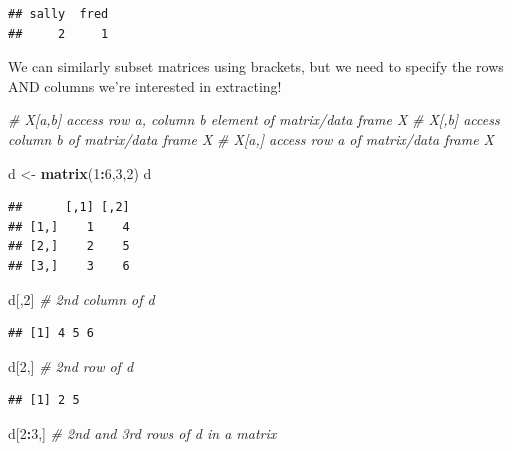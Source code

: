 \documentclass[]{article}
\newenvironment{Shaded}{\begin{snugshade}}{\end{snugshade}}
\newcommand{\KeywordTok}[1]{\textcolor[rgb]{0.13,0.29,0.53}{\textbf{#1}}}
\newcommand{\DecValTok}[1]{\textcolor[rgb]{0.00,0.00,0.81}{#1}}
\newcommand{\StringTok}[1]{\textcolor[rgb]{0.31,0.60,0.02}{#1}}
\newcommand{\CommentTok}[1]{\textcolor[rgb]{0.56,0.35,0.01}{\textit{#1}}}
\newcommand{\OperatorTok}[1]{\textcolor[rgb]{0.81,0.36,0.00}{\textbf{#1}}}
\newcommand{\NormalTok}[1]{#1}
\begin{document}
\begin{verbatim}
## sally  fred 
##     2     1
\end{verbatim}

We can similarly subset matrices using brackets, but we need to specify
the rows AND columns we're interested in extracting!

\begin{Shaded}
\begin{Highlighting}[]
\CommentTok{# X[a,b]       access row a, column b element of matrix/data frame X}
\CommentTok{# X[,b]        access column b of matrix/data frame X}
\CommentTok{# X[a,]        access row a of matrix/data frame X}

\NormalTok{d <-}\StringTok{ }\KeywordTok{matrix}\NormalTok{(}\DecValTok{1}\OperatorTok{:}\DecValTok{6}\NormalTok{,}\DecValTok{3}\NormalTok{,}\DecValTok{2}\NormalTok{)}
\NormalTok{d}
\end{Highlighting}
\end{Shaded}

\begin{verbatim}
##      [,1] [,2]
## [1,]    1    4
## [2,]    2    5
## [3,]    3    6
\end{verbatim}

\begin{Shaded}
\begin{Highlighting}[]
\NormalTok{d[,}\DecValTok{2}\NormalTok{]                }\CommentTok{# 2nd column of d}
\end{Highlighting}
\end{Shaded}

\begin{verbatim}
## [1] 4 5 6
\end{verbatim}

\begin{Shaded}
\begin{Highlighting}[]
\NormalTok{d[}\DecValTok{2}\NormalTok{,]                }\CommentTok{# 2nd row of d}
\end{Highlighting}
\end{Shaded}

\begin{verbatim}
## [1] 2 5
\end{verbatim}

\begin{Shaded}
\begin{Highlighting}[]
\NormalTok{d[}\DecValTok{2}\OperatorTok{:}\DecValTok{3}\NormalTok{,]        }\CommentTok{# 2nd and 3rd rows of d in a matrix}
\end{Highlighting}
\end{Shaded}
\end{document}
